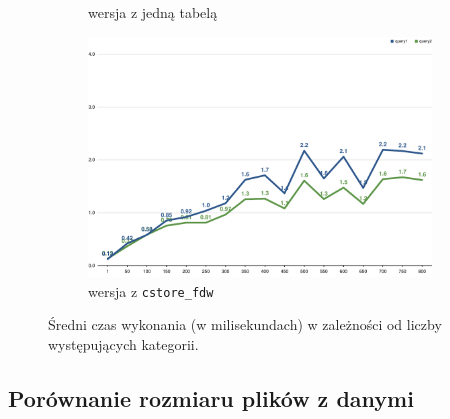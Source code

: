 \documentclass[a4paper,11pt]{article}
\begin{document}
\begin{figure}[h!]
\begin{subfigure}{.49\textwidth}
        \caption{wersja z jedną tabelą}
    \end{subfigure}
    \begin{subfigure}{.5\textwidth}
        \centering
        \includegraphics[width=\textwidth]{charts/execution-time-cstore-fdw-number_of_categories}
        \caption{wersja z \texttt{cstore\_fdw}}
    \end{subfigure}
    \caption{Średni czas wykonania (w milisekundach) w zależności od liczby występujących kategorii.}
    \label{execution-time-number-of-categories}
\end{figure}


\subsection{Porównanie rozmiaru plików z danymi}
\end{document}
